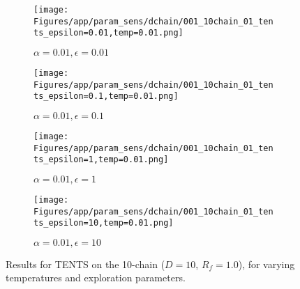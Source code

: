 \documentclass{article}
\theoremstyle{plain}
\begin{document}
\begin{appendices}
\begin{figure}
                \begin{subfigure}[b]{0.24\textwidth}
                    \centering
                    \texttt{[image: Figures/app/param\_sens/dchain/001\_10chain\_01\_tents\_epsilon=0.01,temp=0.01.png]}
                    \caption*{$\alpha=0.01,\epsilon=0.01$}
                \end{subfigure}
                \begin{subfigure}[b]{0.24\textwidth}
                    \centering
                    \texttt{[image: Figures/app/param\_sens/dchain/001\_10chain\_01\_tents\_epsilon=0.1,temp=0.01.png]}
                    \caption*{$\alpha=0.01,\epsilon=0.1$}
                \end{subfigure}
                \begin{subfigure}[b]{0.24\textwidth}
                    \centering
                    \texttt{[image: Figures/app/param\_sens/dchain/001\_10chain\_01\_tents\_epsilon=1,temp=0.01.png]}
                    \caption*{$\alpha=0.01,\epsilon=1$}
                \end{subfigure}
                \begin{subfigure}[b]{0.24\textwidth}
                    \centering
                    \texttt{[image: Figures/app/param\_sens/dchain/001\_10chain\_01\_tents\_epsilon=10,temp=0.01.png]}
                    \caption*{$\alpha=0.01,\epsilon=10$}
                \end{subfigure}
                
                \caption{Results for TENTS on the 10-chain ($D=10$, $R_f=1.0$), for varying temperatures and exploration parameters.}
                \label{fig:tents_10chain_hps}
            \end{figure}


            \begin{figure}
                \centering
                

\end{figure}
\end{appendices}
\end{document}
